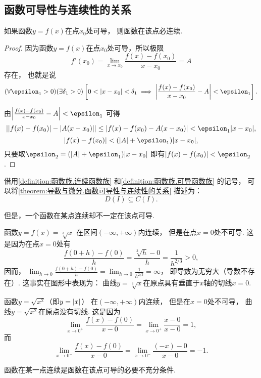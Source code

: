\subsection{函数可导性与连续性的关系}
\begin{theorem}\label{theorem:导数与微分.函数可导性与连续性的关系}
如果函数\(y = f(x)\)在点\(x_0\)处可导，
则函数在该点必连续.
\begin{proof}
因为函数\(y = f(x)\)在点\(x_0\)处可导，所以极限\[
	f'(x_0) = \lim_{x \to x_0}\frac{f(x)-f(x_0)}{x-x_0} = A
\]存在，
也就是说\[
	(\forall \epsilon_1 > 0)
	(\exists \delta_1 > 0)
	\left[
		0 < \abs{x-x_0} < \delta_1
		\implies
		\abs{\frac{f(x)-f(x_0)}{x-x_0} - A} < \epsilon_1
	\right].
\]

由\(\abs{\frac{f(x)-f(x_0)}{x-x_0} - A} < \epsilon_1\)
可得\[
	\abs{\abs{f(x)-f(x_0)} - \abs{A(x-x_0)}}
	\leq \abs{f(x)-f(x_0) - A(x-x_0)}
	< \epsilon_1 \abs{x-x_0},
\]\[
	\abs{f(x)-f(x_0)} < (\abs{A} + \epsilon_1) \abs{x-x_0},
\]
只要取\(\epsilon_2 = (\abs{A} + \epsilon_1) \abs{x-x_0}\)
即有\(\abs{f(x)-f(x_0)} < \epsilon_2\).
\end{proof}
\end{theorem}
借用\cref{definition:函数族.连续函数族} 和\cref{definition:函数族.可导函数族} 的记号，
可以将\cref{theorem:导数与微分.函数可导性与连续性的关系} 描述为：\[
	D(I) \subseteq C(I).
\]

但是，一个函数在某点连续却不一定在该点可导.
\begin{example}
函数\(y=f(x)=\sqrt[3]x\)
在区间\((-\infty,+\infty)\)内连续，
但是在点\(x=0\)处不可导.
这是因为在点\(x=0\)处有\[
	\frac{f(0+h)-f(0)}{h}
	=\frac{\sqrt[3]{h}-0}{h}
	=\frac{1}{h^{2/3}}>0,
\]
因而，
\(\lim_{h\to0} \frac{f(0+h)-f(0)}{h}
=\lim_{h\to0} \frac{1}{h^{2/3}}
=\infty\)，
即导数为无穷大（导数不存在）.
这事实在图形中表现为：
曲线\(y=\sqrt[3]x\)在原点具有垂直于\(x\)轴的切线\(x=0\).
\end{example}

\begin{example}
函数\(y=\sqrt{x^2}\)（即\(y=\abs{x}\)）
在\((-\infty,+\infty)\)内连续，
但是在\(x=0\)处不可导，
曲线\(y=\sqrt{x^2}\)在原点没有切线.
这是因为\[
	\lim_{x\to0^+} \frac{f(x)-f(0)}{x-0}
	= \lim_{x\to0^+} \frac{x-0}{x-0}
	= 1,
\]
而\[
	\lim_{x\to0^-} \frac{f(x)-f(0)}{x-0}
	= \lim_{x\to0^-} \frac{(-x)-0}{x-0}
	= -1.
\]
\end{example}

\begin{remark}
函数在某一点连续是函数在该点可导的必要不充分条件.
\end{remark}

